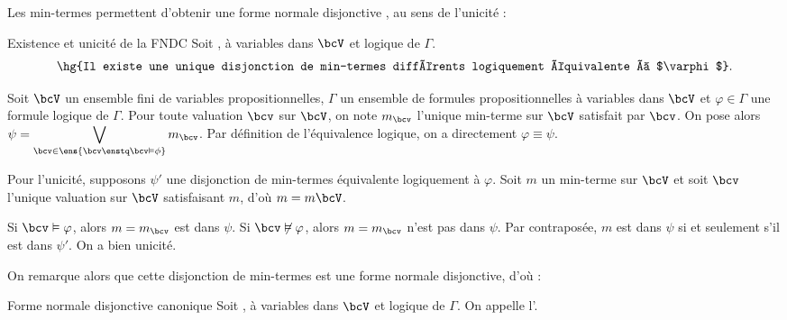     Les min-termes permettent d'obtenir une forme normale disjonctive , au sens de l'unicité :
    \begin{corollary}{Existence et unicité de la FNDC}{}
        Soit ,  à variables dans $\bcV$ et  logique de $\Gamma$.
        \[ \text{\hg{Il existe une unique disjonction de min-termes différents logiquement équivalente à $\varphi$}.} \]
    \end{corollary}
    \begin{nproof}
        Soit $\bcV$ un ensemble fini de variables propositionnelles, $\Gamma$ un ensemble de formules propositionnelles à variables dans $\bcV$ et $\varphi \in \Gamma$ une formule logique de $\Gamma$. Pour toute valuation $\bcv$ sur $\bcV$, on note $m_\bcv$ l'unique min-terme sur $\bcV$ satisfait par $\bcv$. On pose alors $\psi = \displaystyle\bigvee_{\bcv \in \ens{\bcv \enstq \bcv \vDash \phi}} m_\bcv$. Par définition de l'équivalence logique, on a directement $\varphi \equiv \psi$.\medskip
        
        Pour l'unicité, supposons $\psi'$ une disjonction de min-termes équivalente logiquement à $\varphi$. Soit $m$ un min-terme sur $\bcV$ et soit $\bcv$ l'unique valuation sur $\bcV$ satisfaisant $m$, d'où $m = m\bcV$. 
        
        Si $\bcv \vDash \varphi$, alors $m = m_\bcv$ est dans $\psi$. Si $\bcv \not\vDash \varphi$, alors $m = m_\bcv$ n'est pas dans $\psi$. Par contraposée, $m$ est dans $\psi$ si et seulement s'il est dans $\psi'$. On a bien unicité.
    \end{nproof}
    
    On remarque alors que cette disjonction de min-termes est une forme normale disjonctive, d'où :
    \begin{definition}{Forme normale disjonctive canonique}{}
        Soit ,  à variables dans $\bcV$ et  logique de $\Gamma$. On appelle  l'.
    \end{definition}